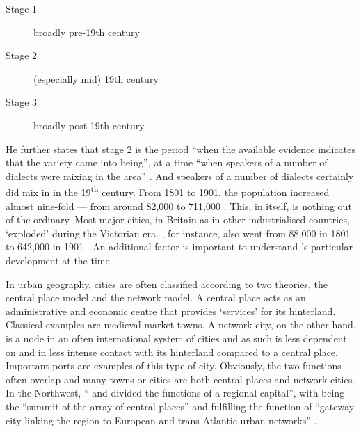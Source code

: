 	\begin{description}
		\item[Stage 1] broadly pre-19th century
		\item[Stage 2] (especially mid) 19th century
		\item[Stage 3] broadly post-19th century
	\end{description}

He further states that stage 2 is the period ``when the available evidence indicates that the variety came into being'', at a time ``when speakers of a number of dialects were mixing in the area'' \citeyearpar[106--107]{honeybone2007}.
And speakers of a number of dialects certainly did mix in  in the 19\textsuperscript{th} century.
From 1801 to 1901, the population increased almost nine-fold --- from around 82,000 to 711,000 \parencite{gbhistgis}.
This, in itself, is nothing out of the ordinary.
Most major cities, in Britain as in other industrialised countries, \enquote*{exploded} during the Victorian era.
, for instance, also went from 88,000 in 1801 to 642,000 in 1901 \parencite{gbhistgis}.
An additional factor is important to understand 's particular development at the time.

In urban geography, cities are often classified according to two theories, the central place model and the network model.
A central place acts as an administrative and economic centre that provides `services' for its hinterland. Classical examples are medieval market towns.
A network city, on the other hand, is a node in an often international system of cities and as such is less dependent on and in less intense contact with its hinterland compared to a central place.
Important ports are  examples of this type of city.
Obviously, the two functions often overlap and many towns or cities are both central places and network cities.
In the Northwest, `` and  divided the functions of a regional capital'', with  being the ``summit of the array of central places'' and  fulfilling the function of ``gateway city linking the region to European and trans-Atlantic urban networks'' \citep[188--189]{hohenberglees1985}.

